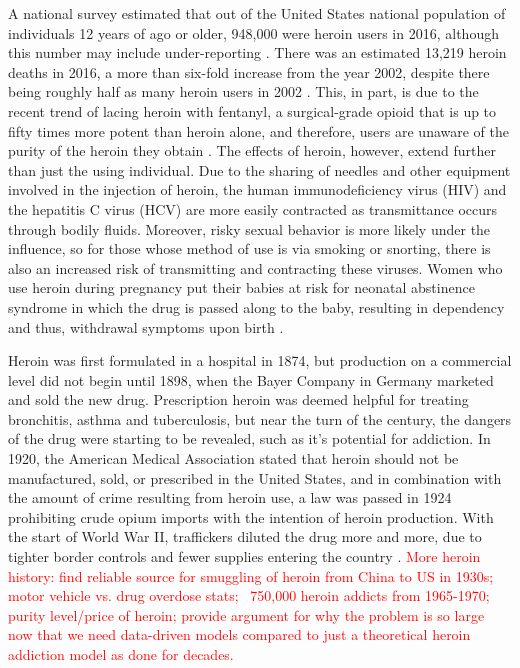 \documentclass[12pt]{article}
\begin{document}
A national survey estimated that out of the United States national population of individuals 12 years of ago or older, 948,000 were heroin users in 2016, although this number may include under-reporting \cite{CDC2}. There was an estimated 13,219 heroin deaths in 2016, a more than six-fold increase from the year 2002, despite there being roughly half as many heroin users in 2002 \cite{NSDUH1}. This, in part, is due to the recent trend of lacing heroin with fentanyl, a surgical-grade opioid that is up to fifty times more potent than heroin alone, and therefore, users are unaware of the purity of the heroin they obtain \cite{CDC1, NIH2, Volkow2}. The effects of heroin, however, extend further than just the using individual. Due to the sharing of needles and other equipment involved in the injection of heroin, the human immunodeficiency virus (HIV) and the hepatitis C virus (HCV) are more easily contracted as transmittance occurs through bodily fluids. Moreover, risky sexual behavior is more likely under the influence, so for those whose method of use is via smoking or snorting, there is also an increased risk of transmitting and contracting these viruses. Women who use heroin during pregnancy put their babies at risk for neonatal abstinence syndrome in which the drug is passed along to the baby, resulting in dependency and thus, withdrawal symptoms upon birth \cite{NIDA2}. 

Heroin was first formulated in a hospital in 1874, but production on a commercial level did not begin until 1898, when the Bayer Company in Germany marketed and sold the new drug. Prescription heroin was deemed helpful for treating bronchitis, asthma and tuberculosis, but near the turn of the century, the dangers of the drug were starting to be revealed, such as it's potential for addiction. In 1920, the American Medical Association stated that heroin should not be manufactured, sold, or prescribed in the United States, and in combination with the amount of crime resulting from heroin use, a law was passed in 1924 prohibiting crude opium imports with the intention of heroin production. With the start of World War II, traffickers diluted the drug more and more, due to tighter border controls and fewer supplies entering the country \cite{UnitedNations}. \textcolor{red}{More heroin history: find reliable source for smuggling of heroin from China to US in 1930s; motor vehicle vs. drug overdose stats; ~750,000 heroin addicts from 1965-1970; purity level/price of heroin; provide argument for why the problem is so large now that we need data-driven models compared to just a theoretical heroin addiction model as done for decades.} 
\end{document}
